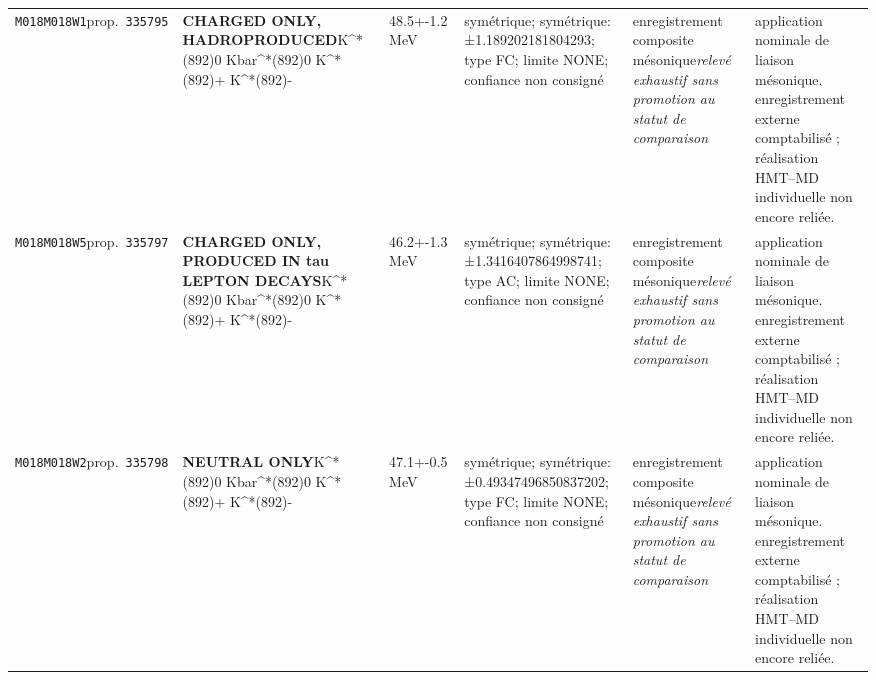 \begin{landscape}
\begin{longtable}{L{1.85cm}L{4.45cm}L{2.35cm}L{4.05cm}L{3.35cm}L{7.15cm}}
\texttt{M018}\newline \texttt{M018W1}\newline prop.\ \texttt{335795} & \textbf{CHARGED ONLY, HADROPRODUCED}\newline K\textasciicircum{}*(892)0 \textbar{}\allowbreak{} Kbar\textasciicircum{}*(892)0 \textbar{}\allowbreak{} K\textasciicircum{}*(892)+ \textbar{}\allowbreak{} K\textasciicircum{}*(892)- & 48.5+-1.2\,MeV & symétrique; symétrique: ±1.189202181804293; type FC; limite NONE; confiance non consigné & enregistrement composite mésonique\newline \emph{relevé exhaustif sans promotion au statut de comparaison} & application nominale de liaison mésonique. enregistrement externe comptabilisé ; réalisation HMT--MD individuelle non encore reliée. \\
\texttt{M018}\newline \texttt{M018W5}\newline prop.\ \texttt{335797} & \textbf{CHARGED ONLY, PRODUCED IN tau LEPTON DECAYS}\newline K\textasciicircum{}*(892)0 \textbar{}\allowbreak{} Kbar\textasciicircum{}*(892)0 \textbar{}\allowbreak{} K\textasciicircum{}*(892)+ \textbar{}\allowbreak{} K\textasciicircum{}*(892)- & 46.2+-1.3\,MeV & symétrique; symétrique: ±1.3416407864998741; type AC; limite NONE; confiance non consigné & enregistrement composite mésonique\newline \emph{relevé exhaustif sans promotion au statut de comparaison} & application nominale de liaison mésonique. enregistrement externe comptabilisé ; réalisation HMT--MD individuelle non encore reliée. \\
\texttt{M018}\newline \texttt{M018W2}\newline prop.\ \texttt{335798} & \textbf{NEUTRAL ONLY}\newline K\textasciicircum{}*(892)0 \textbar{}\allowbreak{} Kbar\textasciicircum{}*(892)0 \textbar{}\allowbreak{} K\textasciicircum{}*(892)+ \textbar{}\allowbreak{} K\textasciicircum{}*(892)- & 47.1+-0.5\,MeV & symétrique; symétrique: ±0.49347496850837202; type FC; limite NONE; confiance non consigné & enregistrement composite mésonique\newline \emph{relevé exhaustif sans promotion au statut de comparaison} & application nominale de liaison mésonique. enregistrement externe comptabilisé ; réalisation HMT--MD individuelle non encore reliée. \\

\end{longtable}
\end{landscape}
